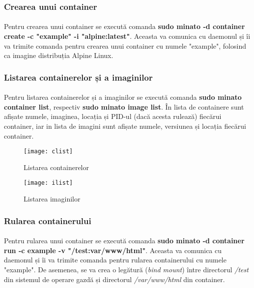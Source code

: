    \subsubsection{Crearea unui container}
        \paragraph{} Pentru crearea unui container se execută comanda \textbf{sudo minato -d container create -c "example" -i "alpine:latest"}. Aceasta va comunica cu daemonul și îi va trimite comanda pentru crearea unui container cu numele "example", folosind ca imagine distribuția Alpine Linux.

    \subsubsection{Listarea containerelor și a imaginilor}
        \paragraph{} Pentru listarea containerelor și a imaginilor se execută comanda \textbf{sudo minato container list}, respectiv \textbf{sudo minato image list}. În lista de containere sunt afișate numele, imaginea, locația și PID-ul (dacă acesta rulează) fiecărui container, iar in lista de imagini sunt afișate numele, versiunea și locația fiecărui container.
        \begin{figure}[h!]
            \centering
            \texttt{[image: clist]}
            \caption{Listarea containerelor}
            \label{fig:clist}
        \end{figure}
        \begin{figure}[h!]
            \centering
            \texttt{[image: ilist]}
            \caption{Listarea imaginilor}
            \label{fig:ilist}
        \end{figure}

    \subsubsection{Rularea containerului}
        \paragraph{} Pentru rularea unui container se execută comanda \textbf{sudo minato -d container run -c example -v "/test:var/www/html"}. Aceasta va comunica cu daemonul și îi va trimite comanda pentru rularea containerului cu numele "example". De asemenea, se va crea o legătură (\textit{bind mount}) între directorul \textit{/test} din sistemul de operare gazdă și directorul \textit{/var/www/html} din container.
